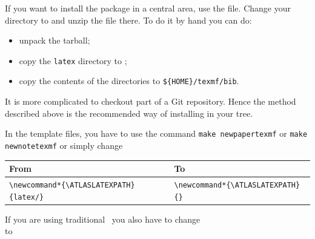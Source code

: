 If you want to install the package in a central area, use the  file.
Change your directory to  and unzip the file there. To do it by hand you can do:
\begin{itemize}
\item unpack the tarball;
\item copy the \texttt{latex} directory to ;
\item copy the contents of the  directories 
  to \texttt{\$\{HOME\}/texmf/bib}.
\end{itemize}
It is more complicated to checkout part of a Git repository.
Hence the method described above is the recommended way of installing
 in your  tree.


In the template files, you have to use the command
\texttt{make newpapertexmf} or \texttt{make newnotetexmf} or simply change
\begin{center}
  \begin{tabular}{ll}
    From & To \\
    \midrule
    \verb|\newcommand*{\ATLASLATEXPATH}{latex/}|    & \verb|\newcommand*{\ATLASLATEXPATH}{}| \\
  \end{tabular}
\end{center}

If you are using traditional \BibTeX\ you also have to change\\
\verb|| to\\
\verb||

